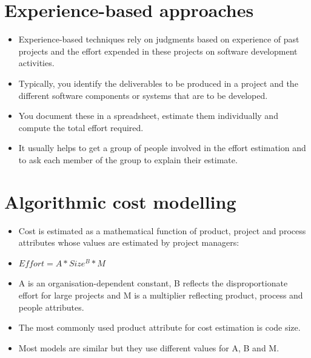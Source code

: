 \section{Experience-based approaches}
\begin{itemize}

\item Experience-based techniques rely on judgments based on experience of past projects and the effort expended in these projects on software development activities.

\item Typically, you identify the deliverables to be produced in a project and the different software components or systems that are to be developed.

\item You document these in a spreadsheet, estimate them individually and compute the total effort required.

\item It usually helps to get a group of people involved in the effort estimation and to ask each member of the group to explain their estimate.
\end{itemize}
\section{Algorithmic cost modelling}
\begin{itemize}


\item Cost is estimated as a mathematical function of product, project and process attributes whose values are estimated by project managers:

  \item $Effort = A * Size^B * M$

  \item A is an organisation-dependent constant, B reflects the disproportionate effort for large projects and M is a multiplier reflecting product, process and people attributes.

\item The most commonly used product attribute for cost estimation is code size.

\item Most models are similar but they use different values for A, B and M.
\end{itemize}
